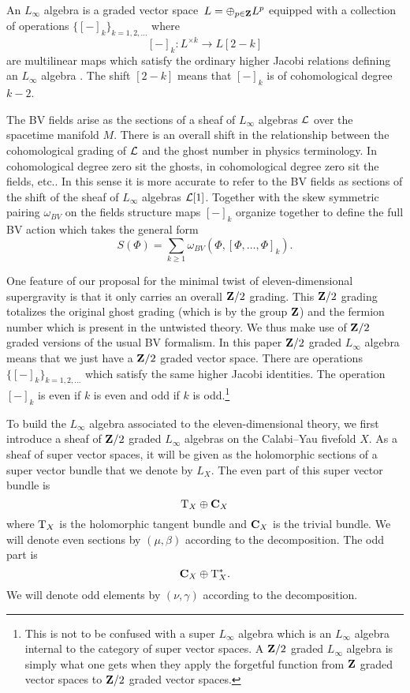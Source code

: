 An $L_\infty$ algebra is a graded vector space~$L=\oplus_{p\in \mathbf{Z}} L^p$ equipped with a collection of operations $\{[-]_k\}_{k = 1,2,\ldots}$ where 
\[
[-]_k \colon L^{\times k} \to L[2-k] 
\]
are multilinear maps which satisfy the ordinary higher Jacobi relations defining an $L_\infty$ algebra \cite{??}. 
The shift $[2-k]$ means that $[-]_k$ is of cohomological degree $k-2$. 

The BV fields arise as the sections of a sheaf of $L_\infty$ algebras $\mathcal L$ over the spacetime manifold $M$.
There is an overall shift in the relationship between the cohomological grading of $\mathcal L$ and the ghost number in physics terminology. 
In cohomological degree zero sit the ghosts, in cohomological degree zero sit the fields, etc..
In this sense it is more accurate to refer to the BV fields as sections of the shift of the sheaf of $L_\infty$ algebras $\mathcal L[1]$. 
Together with the skew symmetric pairing $\omega_{BV}$ on the fields structure maps $[-]_k$ organize together to define the full BV action which takes the general form
\[
S(\Phi) = \sum_{k \geq 1} \omega_{BV} \left(\Phi , [\Phi,\ldots,\Phi]_{k}\right) .
\]

One feature of our proposal for the minimal twist of eleven-dimensional supergravity is that it only carries an overall $\mathbf{Z}/2$ grading. 
This $\mathbf{Z}/2$ grading totalizes the original ghost grading (which is by the group $\mathbf{Z}$) and the fermion number which is present in the untwisted theory.
We thus make use of $\mathbf{Z}/2$ graded versions of the usual BV formalism.
In this paper $\mathbf{Z}/2$ graded $L_\infty$ algebra means that we just have a $\mathbf{Z}/2$ graded vector space.
There are operations $\{[-]_k\}_{k = 1,2,\ldots}$ which satisfy the same higher Jacobi identities.
The operation $[-]_k$ is even if $k$ is even and odd if $k$ is odd.\footnote{This is not to be confused with a super $L_\infty$ algebra which is an $L_\infty$ algebra internal to the category of super vector spaces.
A $\mathbf{Z}/2$ graded $L_\infty$ algebra is simply what one gets when they apply the forgetful function from $\mathbf{Z}$ graded vector spaces to $\mathbf{Z}/2$ graded vector spaces.}

To build the $L_\infty$ algebra associated to the eleven-dimensional theory, we first introduce a sheaf of $\mathbf{Z}/2$ graded $L_\infty$ algebras on the Calabi--Yau fivefold $X$.
As a sheaf of super vector spaces, it will be given as the holomorphic sections of a super vector bundle that we denote by $L_X$. 
The even part of this super vector bundle is
\[
{\rm T}_X \oplus \mathbf{C}_X 
\]
where ${\rm T}_X$ is the holomorphic tangent bundle and $\mathbf{C}_X$ is the trivial bundle.
We will denote even sections by $(\mu, \beta)$ according to the decomposition. 
The odd part is 
\[
\mathbf{C}_X \oplus {\rm T}^*_X .
\]
We will denote odd elements by $(\nu, \gamma)$ according to the decomposition. 

